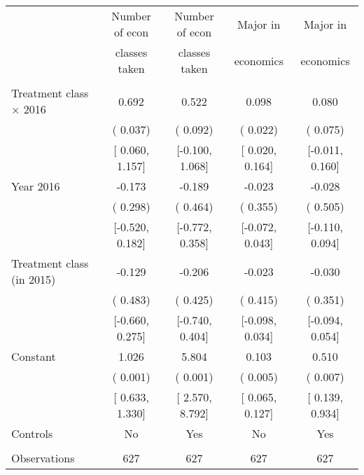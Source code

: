 \begin{tabular}{lcccc} \toprule
& Number of econ  & Number of econ & Major in & Major in\tabularnewline
& classes taken  & classes taken  & economics & economics \tabularnewline \midrule
&  &  &  & \tabularnewline
Treatment class $\times$ 2016 &  0.692 &  0.522 &  0.098 &  0.080\tabularnewline
& ( 0.037) & ( 0.092) & ( 0.022) & ( 0.075)\tabularnewline
& {[} 0.060, 1.157{]} & {[}-0.100, 1.068{]} & {[} 0.020, 0.164{]} & {[}-0.011, 0.160{]}\tabularnewline
Year 2016  & -0.173 & -0.189 & -0.023 & -0.028\tabularnewline
& ( 0.298) & ( 0.464) & ( 0.355) & ( 0.505)\tabularnewline
& {[}-0.520, 0.182{]} & {[}-0.772, 0.358{]} & {[}-0.072, 0.043{]} & {[}-0.110, 0.094{]}\tabularnewline
Treatment class (in 2015) & -0.129 & -0.206 & -0.023 & -0.030\tabularnewline
& ( 0.483) & ( 0.425) & ( 0.415) & ( 0.351)\tabularnewline
& {[}-0.660, 0.275{]} & {[}-0.740, 0.404{]} & {[}-0.098, 0.034{]} & {[}-0.094, 0.054{]}\tabularnewline
Constant  &  1.026 &  5.804 &  0.103 &  0.510\tabularnewline
& ( 0.001) & ( 0.001) & ( 0.005) & ( 0.007)\tabularnewline
& {[} 0.633, 1.330{]} & {[} 2.570, 8.792{]} & {[} 0.065, 0.127{]} & {[} 0.139, 0.934{]}\tabularnewline
Controls & No & Yes & No & Yes\tabularnewline
&  &  &  & \tabularnewline
Observations & 627 & 627 & 627 & 627\tabularnewline
\bottomrule \bottomrule
\end{tabular}

